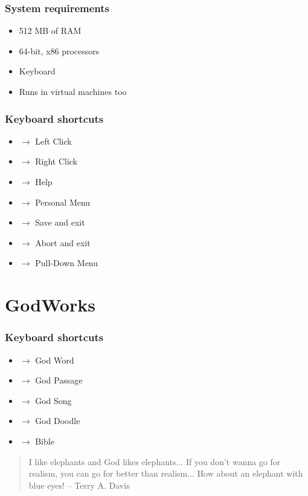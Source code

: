 \documentclass{beamer}
\begin{document}
	\begin{frame}
		\frametitle{System requirements}
		\begin{itemize}
			\item 512 MB of RAM

			\item 64-bit, x86 processors

			\item Keyboard

			\item Runs in virtual machines too
		\end{itemize}
	\end{frame}

	\begin{frame}
		\frametitle{Keyboard shortcuts}
		\begin{itemize}
			\item {} $\rightarrow$ Left Click

			\item {} $\rightarrow$ Right Click

			\item {} $\rightarrow$ Help

			\item {} $\rightarrow$ Personal Menu

			\item {} $\rightarrow$ Save and exit

			\item {} $\rightarrow$ Abort and exit

			\item {} $\rightarrow$ Pull-Down Menu
		\end{itemize}
	\end{frame}

	\section{GodWorks}
	\begin{frame}
		\frametitle{Keyboard shortcuts}
		\begin{itemize}
			\item {} $\rightarrow$ God Word

			\item {} $\rightarrow$ God Passage

			\item {} $\rightarrow$ God Song

			\item {} $\rightarrow$ God Doodle

			\item {} $\rightarrow$ Bible
		\end{itemize}

		\vspace{1em}

		\begin{quote}
			I like elephants and God likes elephants... If you don't wanna go for
			realism, you can go for better than realism... How about an elephant with
			blue eyes! \flushright -- Terry A. Davis
		\end{quote}
	\end{frame}
\end{document}
